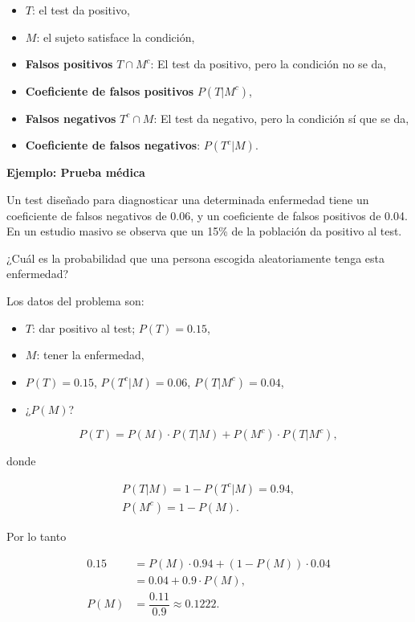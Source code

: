 \documentclass[
  letterpaper,
  DIV=11,
  numbers=noendperiod]{scrreprt}
\providecommand{\tightlist}{%
  \setlength{\itemsep}{0pt}\setlength{\parskip}{0pt}}\usepackage{longtable,booktabs,array}
\begin{document}
\begin{itemize}
\tightlist
\item
  \(T\): el test da positivo,
\item
  \(M\): el sujeto satisface la condición,
\item
  \textbf{Falsos positivos} \(T\cap M^c\): El test da positivo, pero la
  condición no se da,
\item
  \textbf{Coeficiente de falsos positivos} \(P(T|M^c)\),
\item
  \textbf{Falsos negativos} \(T^c\cap M\): El test da negativo, pero la
  condición sí que se da,
\item
  \textbf{Coeficiente de falsos negativos}: \(P(T^c|M)\).
\end{itemize}

\textbf{Ejemplo: Prueba médica}

Un test diseñado para diagnosticar una determinada enfermedad tiene un
coeficiente de falsos negativos de 0.06, y un coeficiente de falsos
positivos de 0.04. En un estudio masivo se observa que un 15\% de la
población da positivo al test.

¿Cuál es la probabilidad que una persona escogida aleatoriamente tenga
esta enfermedad?

Los datos del problema son:

\begin{itemize}
\tightlist
\item
  \(T\): dar positivo al test; \(P(T)=0.15\),
\item
  \(M\): tener la enfermedad,
\item
  \(P(T)=0.15\), \(P(T^c|M)=0.06\), \(P(T|M^c)=0.04\),
\item
  ¿\(P(M)\)?
\end{itemize}

\[
P(T) =P(M)\cdot P(T|M)+P(M^c)\cdot P(T|M^c),
\]

donde

\[
\begin{array}{l}
P(T|M)=1-P(T^c|M)=0.94, \\[1ex]
P(M^c)=1-P(M).
\end{array}
\]

Por lo tanto

\[
\begin{array}{rl}
0.15 & = P(M)\cdot 0.94+(1-P(M))\cdot 0.04\\
 & =0.04+0.9\cdot P(M),\\[1ex]
P(M) & =\dfrac{0.11}{0.9}\approx 0.1222.
\end{array}
\]
\end{document}
